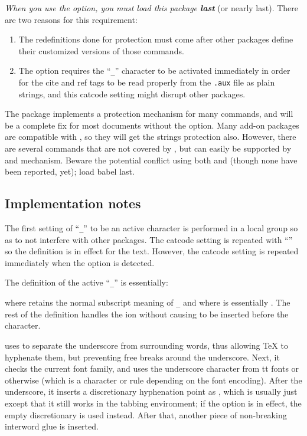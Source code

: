 \documentclass[a4paper]{article}
\begin{document}
\textit{When you use the \option[strings] option, you must load this
  package \textbf{last}} (or nearly last).
There are two reasons for this requirement: 
\begin{enumerate}
\item The redefinitions done for protection must come after other
  packages define their customized versions of those commands.
\item The \option[strings] option requires the ``\texttt{_}'' character to be
  activated immediately in order for the cite and ref tags to be read
  properly from the \texttt{.aux} file as plain strings, and this
  catcode setting might disrupt other packages.
\end{enumerate}

The  package implements a protection mechanism for many
commands, and will be a complete fix for most documents without the
\option[strings] option.  Many add-on packages are compatible with
, so they will get the strings protection also.
However, there are several commands that are not covered by
, but can easily be supported by \option[strings] and 
 mechanism.  Beware the potential conflict
using both \option[strings] and  (though none have been
reported, yet); load babel last.

\subsection*{Implementation notes}

The first setting of ``\texttt{_}'' to be an active character is
performed in a local group so as to not interfere with other packages.
The catcode setting is repeated with ``'' so the
definition is in effect for the text.  However, the catcode setting is
repeated immediately when the \option[strings] option is detected.

The definition of the active ``\texttt{_}'' is essentially:
\begin{quote}
      
\end{quote}
where  retains the normal subscript meaning of \texttt{_} and where
 is essentially \cs{_}.  The rest of the definition
handles the ion without causing  to be inserted before
the character.

 uses  to separate the
underscore from surrounding words, thus allowing \TeX{} to hyphenate them,
but preventing free breaks around the underscore.  Next, it checks the
current font family, and uses the underscore character from tt fonts or
otherwise  (which is a character or rule depending on
the font encoding).  After the underscore, it inserts a discretionary
hyphenation point as , which is usually just \cs{-}
except that it still works in the tabbing environment; if the
\option[nohyphen] option is in effect, the empty discretionary
 is used instead.  After
that, another piece of non-breaking interword glue is inserted. 
\end{document}

